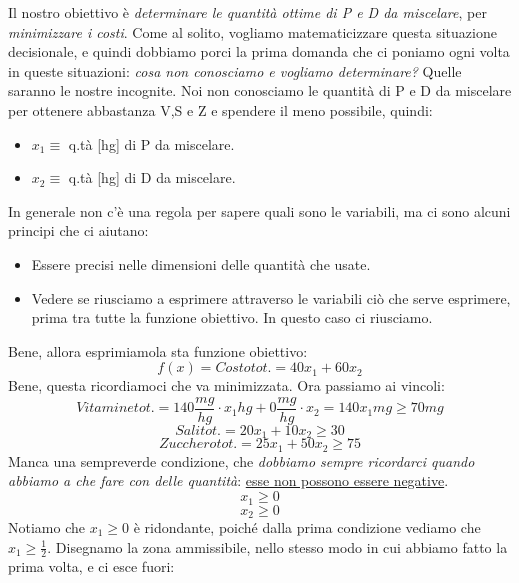 \noindent Il nostro obiettivo è \textit{determinare le quantità ottime di P e D da miscelare}, per \textit{minimizzare i costi}. Come al solito, vogliamo matematicizzare questa situazione decisionale, e quindi dobbiamo porci la prima domanda che ci poniamo ogni volta in queste situazioni: \textit{cosa non conosciamo e vogliamo determinare?} Quelle saranno le nostre incognite. Noi non conosciamo le quantità di P e D da miscelare per ottenere abbastanza V,S e Z e spendere il meno possibile, quindi:
\begin{itemize}
    \item $x_1 \equiv$ q.tà [hg] di P da miscelare.
    \item $x_2 \equiv$ q.tà [hg] di D da miscelare.
\end{itemize}
In generale non c'è una regola per sapere quali sono le variabili, ma ci sono alcuni principi che ci aiutano:
\begin{itemize}
    \item Essere precisi nelle dimensioni delle quantità che usate.
    \item Vedere se riusciamo a esprimere attraverso le variabili ciò che serve esprimere, prima tra tutte la funzione obiettivo. In questo caso ci riusciamo. 
\end{itemize}
Bene, allora esprimiamola sta funzione obiettivo:
\begin{equation*}
    f(x) = Costo tot. = 40x_1 + 60x_2 
\end{equation*}
Bene, questa ricordiamoci che va minimizzata. Ora passiamo ai vincoli:
\begin{equation*}
    Vitamine tot. = 140 \frac{mg}{hg} \cdot x_1 hg  + 0\frac{mg}{hg} \cdot x_2 = 140x_1 mg \geq 70 mg
\end{equation*}
\begin{equation*}
    Sali tot. = 20x_1 + 10x_2 \geq 30
\end{equation*}
\begin{equation*}
    Zucchero tot. = 25x_1 + 50x_2 \geq 75
\end{equation*}
Manca una sempreverde condizione, che \textit{dobbiamo sempre ricordarci quando abbiamo a che fare con delle quantità}: \underline{esse non possono essere negative}.
\begin{equation*}
    x_1 \geq 0 
\end{equation*}
\begin{equation*}
    x_2 \geq 0 
\end{equation*}
Notiamo che $x_1 \geq 0$ è ridondante, poiché dalla prima condizione vediamo che $x_1 \geq \frac{1}{2}$. Disegnamo la zona ammissibile, nello stesso modo in cui abbiamo fatto la prima volta, e ci esce fuori:
\vspace{1cm}

